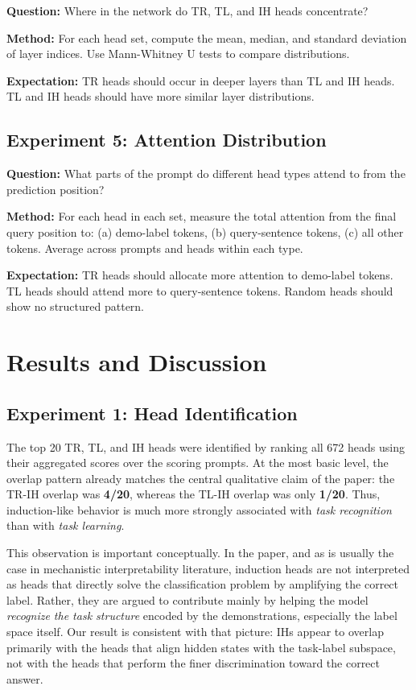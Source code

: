 \documentclass[twoside,english]{article}
\begin{document}
\textbf{Question:} Where in the network do TR, TL, and IH heads concentrate?

\textbf{Method:} For each head set, compute the mean, median, and standard deviation of layer indices. Use Mann-Whitney U tests to compare distributions.

\textbf{Expectation:} TR heads should occur in deeper layers than TL and IH heads. TL and IH heads should have more similar layer distributions.

\subsection{Experiment 5: Attention Distribution}

\textbf{Question:} What parts of the prompt do different head types attend to from the prediction position?

\textbf{Method:} For each head in each set, measure the total attention from the final query position to: (a) demo-label tokens, (b) query-sentence tokens, (c) all other tokens. Average across prompts and heads within each type.

\textbf{Expectation:} TR heads should allocate more attention to demo-label tokens. TL heads should attend more to query-sentence tokens. Random heads should show no structured pattern.

\section{Results and Discussion} \label{sec:results}

\subsection{Experiment 1: Head Identification}

The top 20 TR, TL, and IH heads were identified by ranking all 672 heads using their aggregated scores over the scoring prompts. At the most basic level, the overlap pattern already matches the central qualitative claim of the paper: the TR-IH overlap was \textbf{4/20}, whereas the TL-IH overlap was only \textbf{1/20}. Thus, induction-like behavior is much more strongly associated with \emph{task recognition} than with \emph{task learning}.

This observation is important conceptually. In the paper, and as is usually the case in mechanistic interpretability literature, induction heads are not interpreted as heads that directly solve the classification problem by amplifying the correct label. Rather, they are argued to contribute mainly by helping the model \emph{recognize the task structure} encoded by the demonstrations, especially the label space itself. Our result is consistent with that picture: IHs appear to overlap primarily with the heads that align hidden states with the task-label subspace, not with the heads that perform the finer discrimination toward the correct answer.
\end{document}

